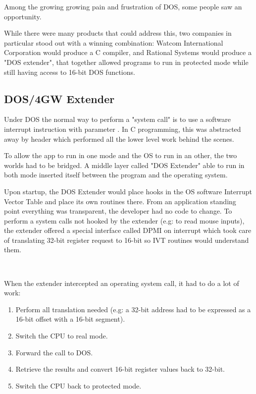\par
Among the growing growing pain and frustration of DOS, some people saw an opportunity.\newpage 

While there were many products that could address this, two companies in particular stood out with a winning combination: Watcom International Corporation would produce a C compiler, and Rational Systems would produce a "DOS extender", that together allowed programs to run in protected mode while still having access to 16-bit DOS functions.\\
\par


\subsection{DOS/4GW Extender}
Under DOS the normal way to perform a "system call" is to use a software interrupt instruction with parameter . In C programming, this was abstracted away by header  which performed all the lower level work behind the scenes.\\
\par
{}
To allow the app to run in one mode and the OS to run in an other, the two worlds had to be bridged. A middle layer called "DOS Extender" able to run in both mode inserted itself between the program and the operating system.\\

\par
{}
Upon startup, the DOS Extender would place hooks in the OS software Interrupt Vector Table and place its own routines there. From an application standing point everything was transparent, the developer had no code to change. To perform a system calls not hooked by the extender (e.g:  to read mouse inputs), the extender offered a special interface called DPMI on interrupt  which took care of translating 32-bit register request to 16-bit so IVT routines would understand them.\\
\par
{}\\
\par
When the extender intercepted an operating system call, it had to do a lot of work:
\begin{enumerate}
\item Perform all translation needed (e.g: a 32-bit address had to be expressed as a 16-bit offset with a 16-bit segment).
\item Switch the CPU to real mode.
\item Forward the call to DOS.
\item Retrieve the results and convert 16-bit register values back to 32-bit.
\item Switch the CPU back to protected mode.
\end{enumerate} 

